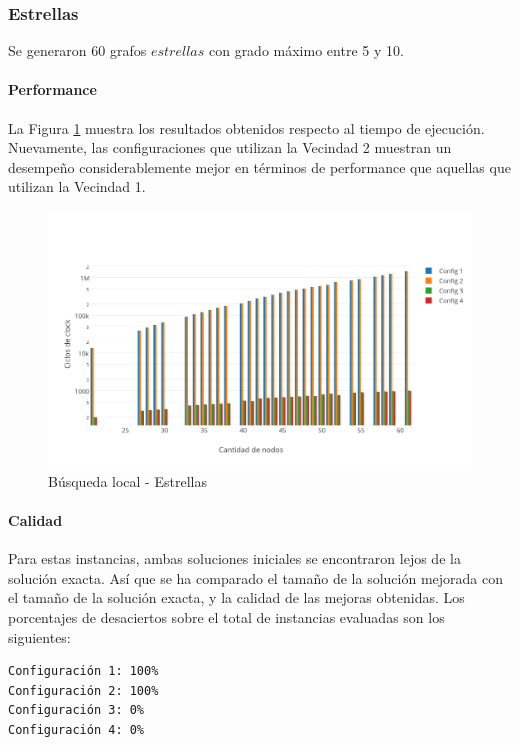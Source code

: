 \subsubsection{Estrellas}

Se generaron 60 grafos $estrellas$ con grado máximo entre 5 y 10.

\paragraph{Performance}

La Figura \ref{fig:3B} muestra los resultados obtenidos respecto al tiempo de ejecución. Nuevamente, las configuraciones que utilizan la Vecindad 2 muestran un desempeño considerablemente mejor en términos de performance que aquellas que utilizan la Vecindad 1.

\begin{figure}[htb]
	\begin{center}
    		\includegraphics[scale=0.8]{imagenes/busqlocal-estrellas-tiempo.png}
	\end{center}
	\caption{Búsqueda local - Estrellas}\label{fig:3B}
\end{figure}

\paragraph{Calidad} Para estas instancias, ambas soluciones iniciales se encontraron lejos de la solución exacta. Así que se ha comparado el tamaño de la solución mejorada con el tamaño de la solución exacta, y la calidad de las mejoras obtenidas.  Los porcentajes de desaciertos sobre el total de instancias evaluadas son los siguientes:

\begin{verbatim}
Configuración 1: 100%
Configuración 2: 100%
Configuración 3: 0%
Configuración 4: 0%
\end{verbatim}

